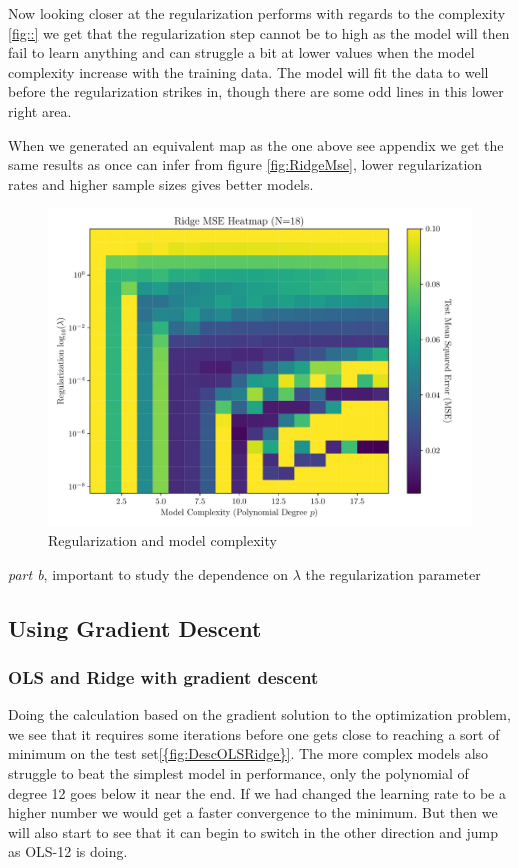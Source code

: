 \documentclass[amssymb,twocolumn,aps]{revtex4}
\begin{document}
Now looking closer at the regularization performs with regards to the complexity \ref{fig::} we get that the regularization step cannot be to high as the model will then fail to learn anything and can struggle a bit at lower values when the model complexity increase with the training data.
The model will fit the data to well before the regularization strikes in, though there are some odd lines in this lower right area.

When we generated an equivalent map as the one above see appendix we get the same results as once can infer from figure \ref{fig:RidgeMse}, lower regularization rates and higher sample sizes gives better models.


\begin{figure}[h]
    \centering
    \includegraphics[width=.95 \linewidth]{Figures/Ridge_Degree_Lambda_Heatmap.pdf}
    \caption{Regularization and model complexity}
    \label{fig:RidgeHeat}
\end{figure}

\textit{part b}, important to study the dependence on $\lambda$ the regularization parameter

\subsection{Using Gradient Descent}

\subsubsection{OLS and Ridge with gradient descent}

Doing the calculation based on the gradient solution to the optimization problem, we see that it requires some iterations before one gets close to reaching a sort of minimum on the test set\ref{{fig:DescOLSRidge}}.
The more complex models also struggle to beat the simplest model in performance, only the polynomial of degree 12 goes below it near the end.
If we had changed the learning rate to be a higher number we would get a faster convergence to the minimum.
But then we will also start to see that it can begin to switch in the other direction and jump as OLS-12 is doing.
\end{document}
